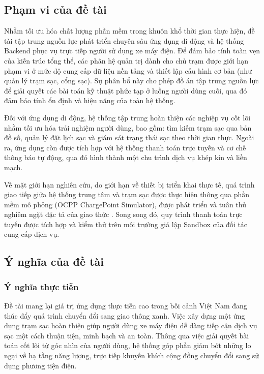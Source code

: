 \subsection{Phạm vi của đề tài}
    Nhằm tối ưu hóa chất lượng phần mềm trong khuôn khổ thời gian thực hiện, đề tài tập trung nguồn lực phát triển chuyên sâu ứng dụng di động và hệ thống Backend phục vụ trực tiếp người sử dụng xe máy điện. Để đảm bảo tính toàn vẹn của kiến trúc tổng thể, các phân hệ quản trị dành cho chủ trạm được giới hạn phạm vi ở mức độ cung cấp dữ liệu nền tảng và thiết lập cấu hình cơ bản (như quản lý trạm sạc, cổng sạc). Sự phân bổ này cho phép đồ án tập trung nguồn lực để giải quyết các bài toán kỹ thuật phức tạp ở luồng người dùng cuối, qua đó đảm bảo tính ổn định và hiệu năng của toàn hệ thống.
    \par
    Đối với ứng dụng di động, hệ thống tập trung hoàn thiện các nghiệp vụ cốt lõi nhằm tối ưu hóa trải nghiệm người dùng, bao gồm: tìm kiếm trạm sạc qua bản đồ số, quản lý đặt lịch sạc và giám sát trạng thái sạc theo thời gian thực. Ngoài ra, ứng dụng còn được tích hợp với hệ thống thanh toán trực tuyến và cơ chế thông báo tự động, qua đó hình thành một chu trình dịch vụ khép kín và liền mạch.
    \par
    Về mặt giới hạn nghiên cứu, do giới hạn về thiết bị triển khai thực tế, quá trình giao tiếp giữa hệ thống trung tâm và trạm sạc được thực hiện thông qua phần mềm mô phỏng (OCPP ChargePoint Simulator), được phát triển và tuân thủ nghiêm ngặt đặc tả của giao thức \cite{ocpp_spec}. Song song đó, quy trình thanh toán trực tuyến được tích hợp và kiểm thử trên môi trường giả lập Sandbox của đối tác cung cấp dịch vụ. 

\subsection{Ý nghĩa của đề tài}
\subsubsection{Ý nghĩa thực tiễn}
    Đề tài mang lại giá trị ứng dụng thực tiễn cao trong bối cảnh Việt Nam đang thúc đẩy quá trình chuyển đổi sang giao thông xanh. Việc xây dựng một ứng dụng trạm sạc hoàn thiện giúp người dùng xe máy điện dễ dàng tiếp cận dịch vụ sạc một cách thuận tiện, minh bạch và an toàn. Thông qua việc giải quyết bài toán cốt lõi từ góc nhìn của người dùng, hệ thống góp phần giảm bớt những lo ngại về hạ tầng năng lượng, trực tiếp khuyến khích cộng đồng chuyển đổi sang sử dụng phương tiện điện.
